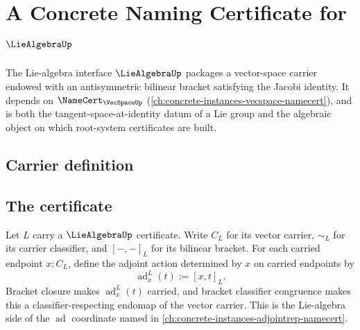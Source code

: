 \chapter{A Concrete Naming Certificate for $\LieAlgebraUp$}
\label{ch:concrete-instances-liealgebra-namecert}

The Lie-algebra interface $\LieAlgebraUp$ packages a vector-space carrier endowed with an antisymmetric bilinear bracket satisfying the Jacobi identity. It depends on $\NameCert_{\VecSpaceUp}$ (\autoref{ch:concrete-instances-vecspace-namecert}), and is both the tangent-space-at-identity datum of a Lie group and the algebraic object on which root-system certificates are built.

\section{Carrier definition}
\label{sec:liealgebra-carrier}

\section{The certificate}
\label{sec:liealgebra-certificate}

\begin{definition}
\label{def:liealgebra-adjoint-action-from-bracket}
Let $L$ carry a $\LieAlgebraUp$ certificate. Write $C_L$ for its vector carrier, $\sim_{L}$ for its carrier classifier, and $[-,-]_L$ for its bilinear bracket. For each carried endpoint $x:C_L$, define the adjoint action determined by $x$ on carried endpoints by
$$
\operatorname{ad}^{L}_{x}(t):=[x,t]_L.
$$
Bracket closure makes $\operatorname{ad}^{L}_{x}(t)$ carried, and bracket classifier congruence makes this a classifier-respecting endomap of the vector carrier. This is the Lie-algebra side of the $\operatorname{ad}$ coordinate named in \autoref{ch:concrete-instances-adjointrep-namecert}.
\end{definition}

